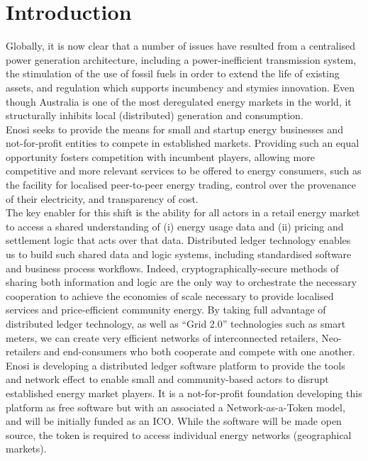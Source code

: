 \documentclass{article}
\theoremstyle{definition}
\theoremstyle{plain} %
\begin{document}
\section{Introduction}

Globally, it is now clear that a number of issues have resulted from a centralised power generation architecture, including a power-inefficient transmission system, the stimulation of the use of fossil fuels in order to extend the life of existing assets, and regulation which supports incumbency and stymies innovation. Even though Australia is one of the most deregulated energy markets in the world, it structurally inhibits local (distributed) generation and consumption. \\

\noindent Enosi seeks to provide the means for small and startup energy businesses and not-for-profit entities to compete in established markets. Providing such an equal opportunity fosters competition with incumbent players, allowing more competitive and more relevant services to be offered to energy consumers, such as the facility for localised peer-to-peer energy trading, control over the provenance of their electricity, and transparency of cost. \\

\noindent The key enabler for this shift is the ability for all actors in a retail energy market to access a shared understanding of (i) energy usage data and (ii) pricing and settlement logic that acts over that data. Distributed ledger technology enables us to build such shared data and logic systems, including standardised software and business process workflows. Indeed, cryptographically-secure methods of sharing both information and logic are the only way to orchestrate the necessary cooperation to achieve the economies of scale necessary to provide localised services and price-efficient community energy. By taking full advantage of distributed ledger technology, as well as “Grid 2.0” technologies such as smart meters, we can create very efficient networks of interconnected retailers, Neo-retailers and end-consumers who both cooperate and compete with one another.\\

\noindent Enosi is developing a distributed ledger software platform to provide the tools and network effect to enable small and community-based actors to disrupt established energy market players. It is a not-for-profit foundation developing this platform as free software but with an associated a Network-as-a-Token model, and will be initially funded as an ICO. While the software will be made open source, the token is required to access individual energy networks (geographical markets).\\
\end{document}
